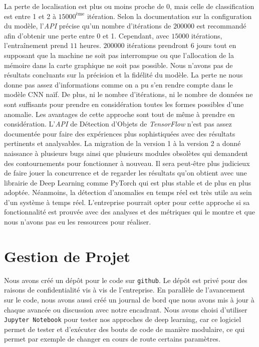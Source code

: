 \documentclass[french]{article}
\theoremstyle{mytheoremstyle}
\theoremstyle{mytheoremstyle}
\theoremstyle{myproblemstyle}
\begin{document}
    
    La perte de localisation est plus ou moins proche de 0, mais celle de classification est entre 1 et 2 à $15000^{\text{ème}}$ itération. Selon la documentation sur la configuration du modèle, l'\emph{API} précise qu'un nombre d'itérations de $200000$ est recommandé afin d'obtenir une perte entre 0 et 1. Cependant, avec $15000$ itérations, l'entraînement prend $11$ heures. $200000$ itérations prendront $6$ jours tout en supposant que la machine ne soit pas interrompue ou que l'allocation de la mémoire dans la carte graphique ne soit pas possible.
    \newline
    \newline
    \indent Nous n'avons pas de résultats concluants sur la précision et la fidélité du modèle. La perte ne nous donne pas assez d'informations comme on a pu s'en rendre compte dans le modèle CNN naïf. De plus, ni le nombre d'itérations, ni le nombre de données ne sont suffisants pour prendre en considération toutes les formes possibles d'une anomalie. Les avantages de cette approche sont tout de même à prendre en considération. L'\emph{API} de Détection d'Objets de \textit{TensorFlow} n'est pas assez documentée pour faire des expériences plus sophistiquées avec des résultats pertinents et analysables. La migration de la version 1 à la version 2 a donné naissance à plusieurs bugs ainsi que plusieurs modules obsolètes qui demandent des contournements pour fonctionner à nouveau. Il sera peut-être plus judicieux de faire jouer la concurrence et de regarder les résultats qu'on obtient avec une librairie de Deep Learning comme PyTorch qui est plus stable et de plus en plus adoptée.
    \newline
    \indent Néanmoins, la détection d'anomalies en temps réel est très utile au sein d'un système à temps réel. L'entreprise pourrait opter pour cette approche si sa fonctionnalité est prouvée avec des analyses et des métriques qui le montre et que nous n'avons pas eu les ressources pour réaliser.
    
    \section{Gestion de Projet}
    
    Nous avons créé un dépôt pour le code sur \texttt{github}. Le dépôt est privé pour des raisons de confidentialité vis à vis de l'entreprise. En parallèle de l'avancement sur le code, nous avons aussi créé un journal de bord que nous avons mis à jour à chaque avancée ou discussion avec notre encadrant. Nous avons choisi d'utiliser \texttt{Jupyter Notebook} pour tester nos approches de deep learning, car ce logiciel permet de tester et d'exécuter des bouts de code de manière modulaire, ce qui permet par exemple de changer en cours de route certains paramètres.
    
\end{document}
